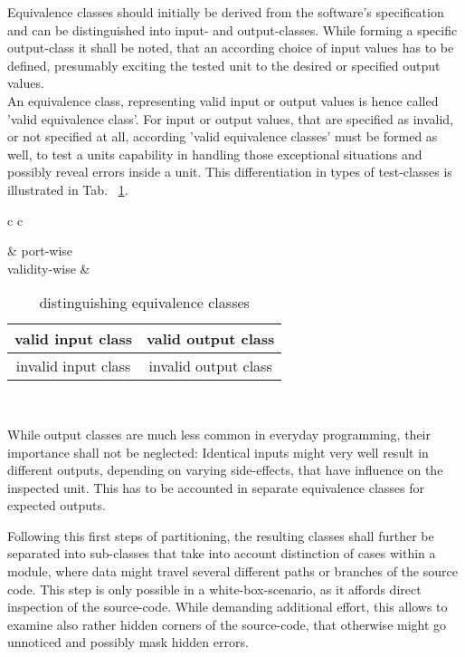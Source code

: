 	Equivalence classes should initially be derived from the software's specification and can be distinguished into input- and output-classes. While forming a specific output-class it shall be noted, that an according choice of input values has to be defined, presumably exciting the tested unit to the desired or specified output values. \\
	An equivalence class, representing valid input or output values is hence called 'valid equivalence class'. For input or output values, that are specified as invalid, or not specified at all, according 'valid equivalence classes' must be formed as well, to test a units capability in handling those exceptional situations and possibly reveal errors inside a unit. This differentiation in types of test-classes is illustrated in Tab. ~\ref{EquiClasses}.
	
	\begin{table}[h!]
	\begin{center}
		\begin{tabular}{c c}
		
						& port-wise  \\
		validity-wise	& \begin{tabular}{|c | c|} \hline
						valid input class 	& valid output class   \\  \hline
						invalid input class 	& invalid output class \\ \hline
							\end{tabular}		\\ %
		\end{tabular}
			\caption{distinguishing equivalence classes}
			\label{EquiClasses}
	\end{center}
	\end{table}
	While output classes are much less common in everyday programming, their importance shall not be neglected: Identical inputs might very well result in different outputs, depending on varying side-effects, that have influence on the inspected unit. This has to be accounted in separate equivalence classes for expected outputs.
	
	Following this first steps of partitioning, the resulting classes shall further be separated into sub-classes that take into account distinction of cases within a module, where data might travel several different paths or branches of the source code. This step is only possible in a white-box-scenario, as it affords direct inspection of the source-code. While demanding additional effort, this allows to examine also rather hidden corners of the source-code, that otherwise might go unnoticed and possibly mask hidden errors.

